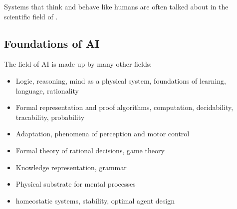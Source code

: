 \documentclass[
../EiKI_Summary.tex,
]
{subfiles}
\begin{document}
Systems that think and behave like humans are often talked about in the scientific field of .

\subsection{Foundations of AI}

The field of AI is made up by many other fields:
\begin{itemize}
    \item {} Logic, reasoning, mind as a physical system, foundations of learning, language, rationality
    \item {} Formal representation and proof algorithms, computation, decidability, tracability, probability
    \item {} Adaptation, phenomena of perception and motor control
    \item {} Formal theory of rational decisions, game theory
    \item {} Knowledge representation, grammar
    \item {} Physical substrate for mental processes
    \item {} homeostatic systems, stability, optimal agent design
\end{itemize}
\end{document}
